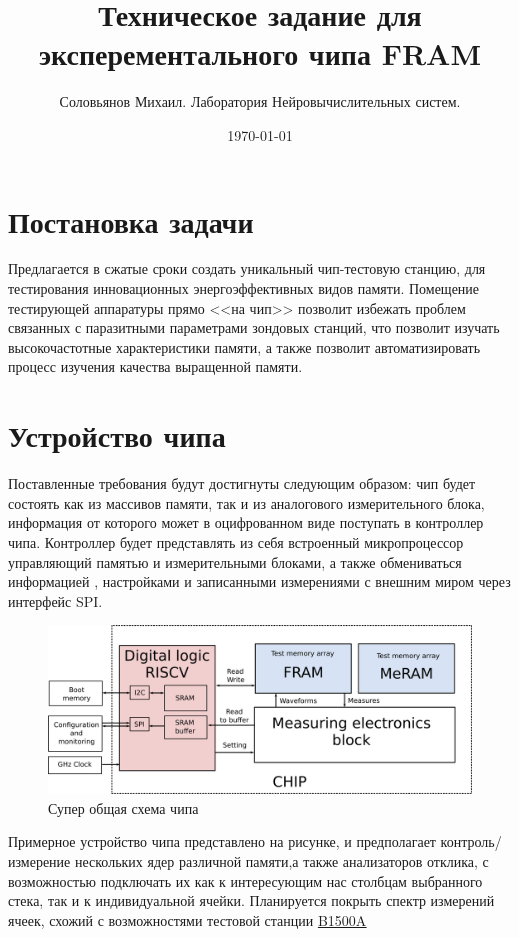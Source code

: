 \documentclass[a4paper,12pt]{article} %
\author{Соловьянов Михаил. Лаборатория Нейровычислительных систем.}
\title{Техническое задание для эксперементального чипа FRAM}
\date{\today}
\begin{document}
\thispagestyle{fancy}
\maketitle



\section{ Постановка задачи}


Предлагается в сжатые сроки создать уникальный чип-тестовую станцию, для тестирования инновационных энергоэффективных видов памяти. Помещение тестирующей аппаратуры прямо <<на чип>> позволит избежать проблем связанных с паразитными  параметрами зондовых станций, что позволит изучать высокочастотные характеристики памяти, а также позволит автоматизировать процесс изучения качества выращенной памяти. 

\section{Устройство чипа}

Поставленные требования будут достигнуты следующим образом: чип будет состоять как из массивов памяти, так и из аналогового измерительного блока, информация от которого может в оцифрованном виде поступать в контроллер чипа. Контроллер будет представлять из себя встроенный микропроцессор управляющий памятью и измерительными блоками, а также обмениваться информацией , настройками и записанными измерениями с внешним миром через интерфейс SPI. 
\begin{figure}[h]
\centering
\includegraphics[width=\textwidth]{top.png}
\caption{Супер общая схема чипа}
\end{figure}

Примерное устройство чипа представлено на рисунке, и предполагает контроль/измерение нескольких ядер различной памяти,а также анализаторов отклика, с возможностью подключать их как к интересующим нас столбцам выбранного стека, так и к индивидуальной ячейки. Планируется покрыть спектр измерений ячеек, схожий с возможностями тестовой станции \underline{ \href{https://www.keysight.com/ru/ru/assets/7018-01289/data-sheets/5989-2785.pdf}{B1500A} }
\end{document}
